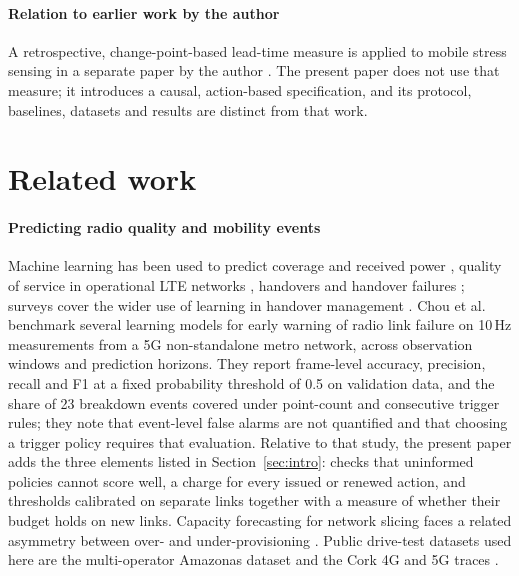 \documentclass[preprint,review,12pt]{elsarticle}
\begin{document}
\paragraph{Relation to earlier work by the author}
A retrospective, change-point-based lead-time measure is applied to mobile stress
sensing in a separate paper by the author \cite{daniel2026sh}. The present paper
does not use that measure; it introduces a causal, action-based specification, and
its protocol, baselines, datasets and results are distinct from that work.

\section{Related work}
\label{sec:related}

\paragraph{Predicting radio quality and mobility events}
Machine learning has been used to predict coverage and received power
\cite{fauzi2022,mohammadjafari2020}, quality of service in operational LTE
networks \cite{mollel2021}, handovers and handover failures
\cite{lima2023,manalastas2023,pjanic2024}; surveys cover the wider use of learning
in handover management \cite{tayyab2019,mollel2021survey,alraih2023}. Chou et
al.\ \cite{chou2025} benchmark several learning models for early warning of radio
link failure on 10\,Hz measurements from a 5G non-standalone metro network,
across observation windows and prediction horizons. They report frame-level
accuracy, precision, recall and F1 at a fixed probability threshold of 0.5 on
validation data, and the share of 23 breakdown events covered under point-count and
consecutive trigger rules; they note that event-level false alarms are not quantified
and that choosing a trigger policy requires that evaluation. Relative to that study, the present paper adds the three elements listed
in Section~\ref{sec:intro}: checks that uninformed policies cannot score well, a
charge for every issued or renewed action, and thresholds calibrated on separate links
together with a measure of whether their budget holds on new links. Capacity forecasting for
network slicing faces a related asymmetry between over- and under-provisioning
\cite{bega2019}. Public drive-test datasets used here are the multi-operator
Amazonas dataset \cite{silva2024} and the Cork 4G and 5G traces
\cite{raca2018,raca2020}.
\end{document}

